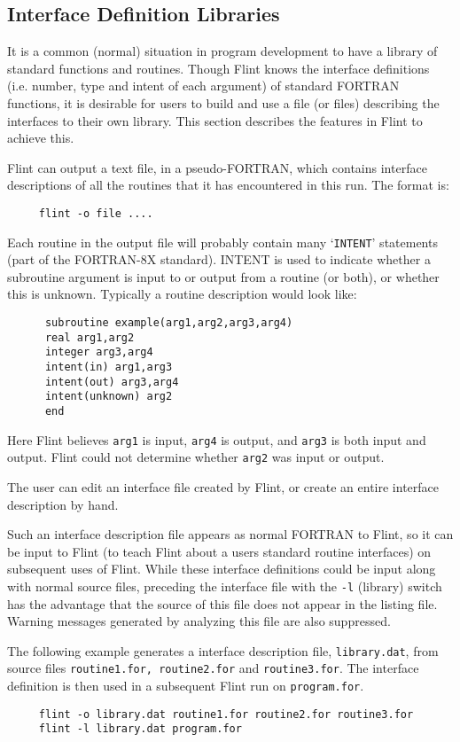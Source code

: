 \subsection{Interface Definition Libraries}
It is a common (normal) situation in program development to have a library
of standard functions and routines. Though Flint knows the interface
definitions (i.e. number, type and intent of each argument) of standard
FORTRAN
functions, it is desirable for users to build and use a file (or
files) describing the interfaces to their own library. This section describes
the features in Flint to achieve this.

Flint can output a text file, in a pseudo-FORTRAN, which contains interface
descriptions of all the routines that it has encountered in this run. The
format is:
\begin{verbatim}
     flint -o file ....
\end{verbatim}
Each routine in the output file will probably contain many `{\tt INTENT}'
statements (part of the FORTRAN-8X standard). INTENT is used to indicate
whether a
subroutine argument is input to or output from a routine (or both),
or whether this is unknown. Typically a routine description would look
like:
\begin{verbatim}
      subroutine example(arg1,arg2,arg3,arg4)
      real arg1,arg2
      integer arg3,arg4
      intent(in) arg1,arg3
      intent(out) arg3,arg4
      intent(unknown) arg2
      end
\end{verbatim}
Here Flint believes {\tt arg1} is input, {\tt arg4} is output, and {\tt arg3}
is both input and output. Flint could not determine whether {\tt arg2} was
input or output.

The user can edit an interface file created by Flint, or create an
entire interface description by hand.

Such an interface description file appears as normal FORTRAN to Flint, so it
can be input to Flint (to teach Flint about a users standard routine interfaces)
on subsequent uses of Flint. While these interface definitions could
be input along with normal source files, preceding the interface file with
the {\tt -l} (library) switch has the advantage that the source of this
file does not appear in the listing file. Warning messages generated by
analyzing this file are also suppressed.

The following example generates a interface description file, {\tt library.dat},
from source files {\tt routine1.for, routine2.for} and {\tt routine3.for}.
The interface definition is then used in a subsequent Flint run on
{\tt program.for}.
\begin{verbatim}
     flint -o library.dat routine1.for routine2.for routine3.for
     flint -l library.dat program.for
\end{verbatim}

